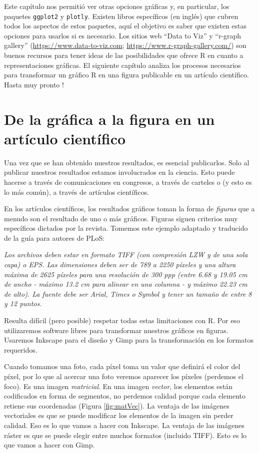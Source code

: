 \documentclass[
]{book}
\begin{document}
Este capítulo nos permitió ver otras opciones gráficas y, en particular, los paquetes \texttt{ggplot2} y \texttt{plotly}. Existen libros específicos (en inglés) que cubren todos los aspectos de estos paquetes, aquí el objetivo es saber que existen estas opciones para usarlos si es necesario. Los sitios web ``Data to Viz'' y ``r-graph gallery'' (\url{https://www.data-to-viz.com}; \url{https://www.r-graph-gallery.com/}) son buenos recursos para tener ideas de las posibilidades que ofrece R en cuanto a representaciones gráficas. El siguiente capítulo analiza los procesos necesarios para transformar un gráfico R en una figura publicable en un artículo científico. Hasta muy pronto !

\hypertarget{graph4}{%
\chapter{De la gráfica a la figura en un artículo científico}\label{graph4}}

Una vez que se han obtenido nuestros resultados, es esencial publicarlos. Solo al publicar nuestros resultados estamos involucrados en la ciencia. Esto puede hacerse a través de comunicaciones en congresos, a través de carteles o (y esto es lo más común), a través de artículos científicos.

En los artículos científicos, los resultados gráficos toman la forma de \emph{figuras} que a menudo son el resultado de uno o más gráficos. Figuras siguen criterios muy específicos dictados por la revista. Tomemos este ejemplo adaptado y traducido de la guía para autores de PLoS:

\emph{Los archivos deben estar en formato TIFF (con compresión LZW y de una sola capa) o EPS. Las dimensiones deben ser de 789 a 2250 píxeles y una altura máxima de 2625 píxeles para una resolución de 300 ppp (entre 6.68 y 19.05 cm de ancho - máximo 13.2 cm para alinear en una columna - y máximo 22.23 cm de alto). La fuente debe ser Arial, Times o Symbol y tener un tamaño de entre 8 y 12 puntos.}

Resulta difícil (pero posible) respetar todas estas limitaciones con R. Por eso utilizaremos software libres para transformar nuestros gráficos en figuras. Usaremos Inkscape para el diseño y Gimp para la transformación en los formatos requeridos.

Cuando tomamos una foto, cada píxel toma un valor que definirá el color del píxel, por lo que al acercar una foto veremos aparecer los píxeles (perdemos el foco). Es una imagen \emph{matricial}. En una imagen \emph{vector}, los elementos están codificados en forma de segmentos, no perdemos calidad porque cada elemento retiene sus coordenadas (Figura \ref{fig:matVec}). La ventaja de las imágenes vectoriales es que se puede modificar los elementos de la imagen sin perder calidad. Eso es lo que vamos a hacer con Inkscape. La ventaja de las imágenes ráster es que se puede elegir entre muchos formatos (incluido TIFF). Esto es lo que vamos a hacer con Gimp.
\end{document}

